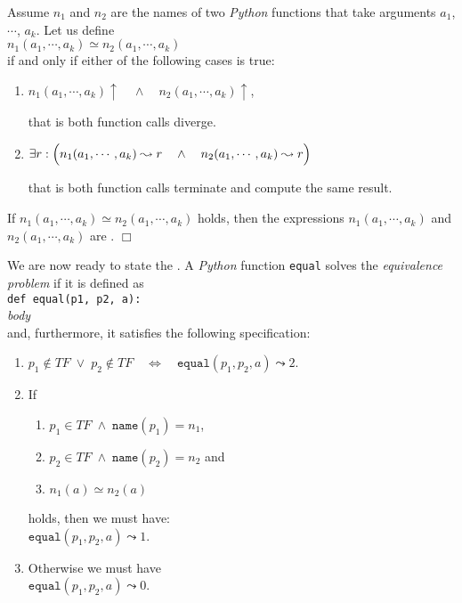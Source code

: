 \begin{Definition}[$\simeq$] 
Assume $n_1$ and $n_2$ are the names of two \textsl{Python} functions that take arguments
  $a_1$, $\cdots$, $a_k$.  Let us define \\[0.2cm]
\hspace*{1.3cm} 
$n_1(a_1,\cdots,a_k) \simeq n_2(a_1,\cdots,a_k)$ 
\\[0.2cm]
if and only if either of the following cases is true:
\begin{enumerate}
\item $n_1(a_1,\cdots,a_k)\uparrow \quad\wedge\quad n_2(a_1,\cdots,a_k)\uparrow$,

      that is both function calls diverge.
\item $\exists r: \Bigl(n_1(a_1,\cdots,a_k) \leadsto r \quad\wedge\quad n_2(a_1,\cdots,a_k) \leadsto
  r\Bigr)$

      that is both function calls terminate and compute the same result.
\end{enumerate}
If $n_1(a_1,\cdots,a_k) \simeq n_2(a_1,\cdots,a_k)$ holds, then the expressions $n_1(a_1,\cdots,a_k)$ and $n_2(a_1,\cdots,a_k)$ are 
. \hspace*{\fill} $\Box$
\end{Definition}

\noindent
We are now ready to state the .  A \textsl{Python} function \texttt{equal} solves the
\emph{equivalence problem} if it is defined as
\\[0.2cm]
\hspace*{1.3cm} \texttt{def equal(p1, p2, a):}               \\
\hspace*{1.8cm} \textsl{body}                                \\[0.2cm]
and, furthermore, it satisfies the following specification:
\begin{enumerate}
\item $p_1 \not\in T\!F \;\vee\; p_2 \not\in T\!F \quad\Leftrightarrow\quad \mathtt{equal}(p_1, p_2, a) \leadsto 2$.
\item If 
      \begin{enumerate}
      \item $p_1 \in T\!F \;\wedge\; \mathtt{name}(p_1) = n_1$,
      \item $p_2 \in T\!F \;\wedge\; \mathtt{name}(p_2) = n_2$ \quad and
      \item $n_1(a) \simeq n_2(a)$
      \end{enumerate}
      holds, then we must have: 
      \\[0.2cm]
      \hspace*{1.3cm} 
      $\mathtt{equal}(p_1, p_2, a) \leadsto 1$.
\item Otherwise we must have \\[0.2cm]
      \hspace*{1.3cm} 
      $\mathtt{equal}(p_1, p_2, a) \leadsto 0$.
\end{enumerate}


